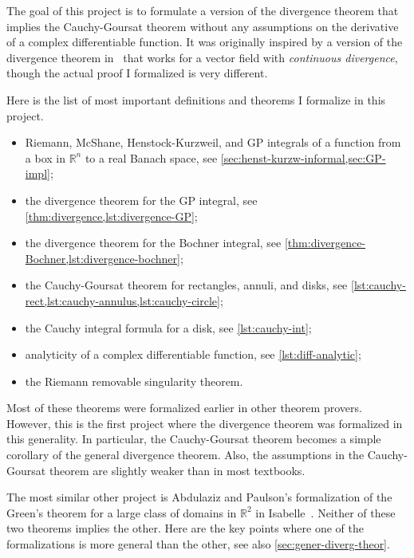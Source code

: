 \documentclass[a4paper,UKenglish,cleveref, autoref, thm-restate]{lipics-v2021}
\newcommand{\bbR}{\mathbb{R}}
\begin{document}
The goal of this project is to formulate a version of the divergence
theorem that implies the Cauchy-Goursat theorem without any
assumptions on the derivative of a complex differentiable function. It
was originally inspired by a version of the divergence theorem
in~\cite{Acker1996} that works for a vector field with
\emph{continuous divergence}, though the actual proof I formalized is
very different.

Here is the list of most important definitions and theorems I
formalize in this project.
\begin{itemize}
\item Riemann, McShane, Henstock-Kurzweil, and GP integrals of a
  function from a box in \(\bbR^{n}\) to a real Banach space, see
  \cref{sec:henst-kurzw-informal,sec:GP-impl};
\item the divergence theorem for the GP integral, see
  \cref{thm:divergence,lst:divergence-GP};
\item the divergence theorem for the Bochner integral, see
  \cref{thm:divergence-Bochner,lst:divergence-bochner};
\item the Cauchy-Goursat theorem for rectangles, annuli, and disks,
  see \cref{lst:cauchy-rect,lst:cauchy-annulus,lst:cauchy-circle};
\item the Cauchy integral formula for a disk, see \cref{lst:cauchy-int};
\item analyticity of a complex differentiable function, see
  \cref{lst:diff-analytic};
\item the Riemann removable singularity theorem.
\end{itemize}

Most of these theorems were formalized earlier in other theorem
provers. However, this is the first project where the divergence
theorem was formalized in this generality. In particular, the
Cauchy-Goursat theorem becomes a simple corollary of the general
divergence theorem. Also, the assumptions in the Cauchy-Goursat
theorem are slightly weaker than in most textbooks.

The most similar other project is Abdulaziz and Paulson's
formalization of the Green's theorem for a large class of domains in
\(\bbR^{2}\) in Isabelle~\cite{Abdulaziz_Paulson}. Neither of these
two theorems implies the other. Here are the key points where one of
the formalizations is more general than the other, see also
\autoref{sec:gener-diverg-theor}.
\end{document}
